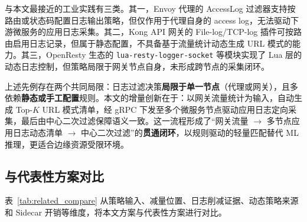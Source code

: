 与本文最接近的工业实践有三类。其一，Envoy 代理的 AccessLog 过滤器支持按路由或状态码配置日志输出策略，但仅作用于代理自身的 access log，无法驱动下游微服务的应用日志采集。其二，Kong API 网关的 File-log/TCP-log 插件可按路由启用日志记录，但属于静态配置，不具备基于流量统计动态生成 URL 模式的能力。其三，OpenResty 生态的 \texttt{lua-resty-logger-socket} 等模块实现了 Lua 层的动态日志控制，但策略局限于网关节点自身，未形成跨节点的采集闭环。

上述先例存在两个共同局限：日志过滤决策\textbf{局限于单一节点}（代理或网关），且多依赖\textbf{静态或手工配置}规则。本文的增量创新在于：以网关流量统计为输入，自动生成 Top-$K$ URL 模式清单，经 gRPC 下发至多个微服务节点驱动应用日志定向采集，最后由中心二次过滤保障语义一致。这一流程形成了``网关流量 $\rightarrow$ 多节点应用日志动态清单 $\rightarrow$ 中心二次过滤''的\textbf{贯通闭环}，以规则驱动的轻量匹配替代 ML 推理，更适合边缘资源受限环境。

\subsection{与代表性方案对比}
表~\ref{tab:related_compare} 从策略输入、减量位置、日志削减证据、动态策略来源和 Sidecar 开销等维度，将本文方案与代表性方案进行对比。

\begin{table}[htbp]
  \centering
  \caption{与代表性日志采集/可观测性方案对比}
  \label{tab:related_compare}
  \small
\end{table}

